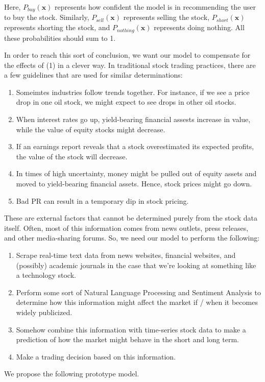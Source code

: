 \documentclass[final]{article}
\begin{document}
Here, $P_{buy}(\mathbf{x})$ represents how confident the model is in
recommending the user to buy the stock. Similarly,
$P_{sell}(\mathbf{x})$ represents selling the stock,
$P_{short}(\mathbf{x})$ represents shorting the stock, and
$P_{nothing}(\mathbf{x})$ represents doing nothing. All these
probabilities should sum to 1.

In order to reach this sort of conclusion, we want our model to
compensate for the effects of (1) in a clever way. In traditional
stock trading practices, there are a few guidelines that are used for
similar determinations:
\begin{enumerate}
  \item Someimtes industries follow trends together. For instance, if
    we see a price drop in one oil stock, we might expect to see drops
    in other oil stocks.
  \item When interest rates go up, yield-bearing financial assests
    increase in value, while the value of equity stocks might
    decrease.
  \item If an earnings report reveals that a stock overestimated its
    expected profits, the value of the stock will decrease.
  \item In times of high uncertainty, money might be pulled out of
    equity assets and moved to yield-bearing financial assets. Hence,
    stock prices might go down.
  \item Bad PR can result in a temporary dip in stock pricing.
\end{enumerate}

These are external factors that cannot be determined purely from the
stock data itself. Often, most of this information comes from news
outlets, press releases, and other media-sharing forums. So, we need
our model to perform the following:
\begin{enumerate}
  \item Scrape real-time text data from news websites, financial
    websites, and (possibly) academic journals in the case that we're
    looking at something like a technology stock.
  \item Perform some sort of Natural Language Processing and Sentiment
    Analysis to determine how this information might affect the market
    if / when it becomes widely publicized.
  \item Somehow combine this information with time-series stock data
    to make a prediction of how the market might behave in the short
    and long term.
  \item Make a trading decision based on this information.
\end{enumerate}
We propose the following prototype model.
\end{document}
